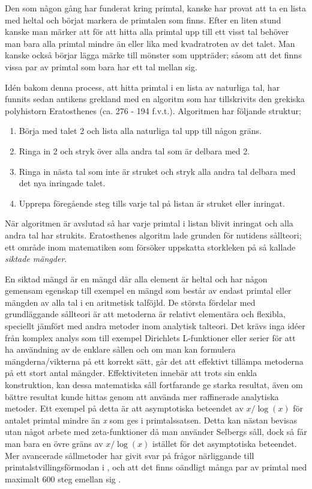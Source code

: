 Den som någon gång har funderat kring primtal, kanske har provat att ta en lista med heltal och börjat markera de primtalen som finns. 
Efter en liten stund kanske man märker att för att hitta alla primtal upp till ett visst tal behöver man bara alla primtal mindre än eller lika med kvadratroten av det talet. 
Man kanske också börjar lägga märke till mönster som uppträder; såsom att det finns vissa par av primtal som bara har ett tal mellan sig. 

Idén bakom denna process, att hitta primtal i en lista av naturliga tal, har funnits sedan antikens grekland med en algoritm som har tillskrivits den grekiska polyhistorn Eratosthenes (ca. 276 - 194 f.v.t.). Algoritmen har följande struktur;
\begin{enumerate}
    \item Börja med talet 2 och lista alla naturliga tal upp till någon gräns.
    \item Ringa in 2 och stryk över alla andra tal som är delbara med 2.
    \item Ringa in nästa tal som inte är struket och stryk alla andra tal delbara med det nya inringade talet.
    \item Upprepa föregående steg tills varje tal på listan är struket eller inringat. 
\end{enumerate}
När algoritmen är avslutad så har varje primtal i listan blivit inringat och alla andra tal har strukits. 
Eratosthenes algoritm lade grunden för nutidens sållteori; ett område inom matematiken som försöker uppskatta storkleken på så kallade \textit{siktade mängder}. 

En siktad mängd är en mängd där alla element är heltal och har någon gemensam egenskap till exempel en mängd som består av endast primtal eller mängden av alla tal i en aritmetisk talföjld.
De största fördelar med grundläggande sållteori är att metoderna är relativt elementära och flexibla, speciellt jämfört med andra metoder inom analytisk talteori. 
Det krävs inga idéer från komplex analys som till exempel Dirichlets L-funktioner eller serier för att ha användning av de enklare sållen och om man kan formulera mängderna/vikterna på ett korrekt sätt, går det att effektivt tillämpa metoderna på ett stort antal mängder. 
Effektiviteten innebär att trots sin enkla konstruktion, kan dessa matematiska såll fortfarande ge starka resultat, även om bättre resultat kunde hittas genom att använda mer raffinerade analytiska metoder. 
Ett exempel på detta är att asymptotiska beteendet av \(x/\log(x)\) för antalet primtal mindre än \textit{x} som ges i primtalssatsen. 
Detta kan nästan bevisas utan något arbete med zeta-funktioner då man använder Selbergs såll, dock så får man bara en övre gräns av \(x/\log(x)\) istället för det asymptotiska beteendet. 
Mer avancerade sållmetoder har givit svar på frågor närliggande till primtalstvillingsförmodan i \cite{chen2Prime}, och att det finns oändligt många par av primtal med maximalt 600 steg emellan sig \cite{mayBound}.

